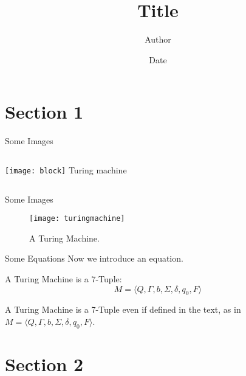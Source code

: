 \documentclass[aspectratio=169]{beamer}
\title              {Title}
\author             {Author}
\institute          {Institute, University of Basel}
\date               {Date}
\begin{document}
\begin{frame}[t,plain]
\titlepage
\end{frame}


\section{Section 1}	%

\begin{frame}[c]{Some Images}
\begin{columns}[c]
            \texttt{[image: block]}
            Turing machine
\end{columns}
\end{frame}


\begin{frame}[c]{Some Images}
    \begin{figure}
        \texttt{[image: turingmachine]}
        \caption{A Turing Machine.}
    \end{figure}
\end{frame}


\begin{frame}[c]{Some Equations}
Now we introduce an equation.
\begin{theorem}
A Turing Machine is a 7-Tuple:
\begin{equation}
    M = \langle Q, \Gamma, b, \Sigma, \delta, q_0, F \rangle
\end{equation}
\end{theorem}
A Turing Machine is a 7-Tuple even if defined in the text, as in $M = \langle Q, \Gamma, b, \Sigma, \delta, q_0, F \rangle$.
\end{frame}


\section{Section 2}
\end{document}

